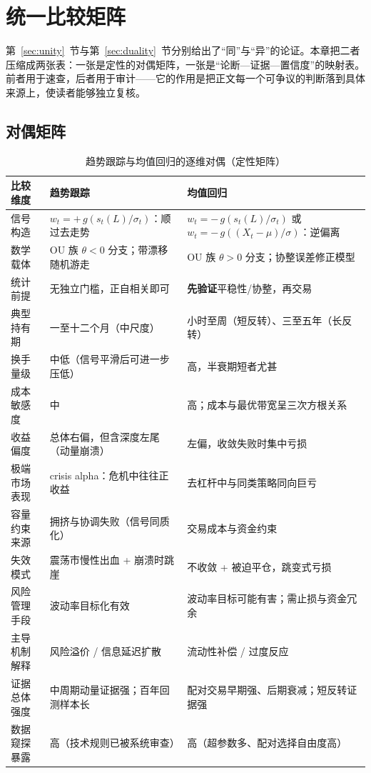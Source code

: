 \section{统一比较矩阵}\label{sec:matrix}

第~\ref{sec:unity}~节与第~\ref{sec:duality}~节分别给出了“同”与“异”的论证。本章把二者压缩成两张表：一张是定性的对偶矩阵，一张是“论断—证据—置信度”的映射表。前者用于速查，后者用于审计——它的作用是把正文每一个可争议的判断落到具体来源上，使读者能够独立复核。

\subsection{对偶矩阵}

\begin{table}[htbp]
\centering\footnotesize
\caption{趋势跟踪与均值回归的逐维对偶（定性矩阵）}\label{tab:dual}
\begin{tabular}{@{}>{\raggedright\arraybackslash}p{2.5cm}>{\raggedright\arraybackslash}p{6.1cm}>{\raggedright\arraybackslash}p{6.1cm}@{}}
\toprule
\textbf{比较维度} & \textbf{趋势跟踪} & \textbf{均值回归} \\
\midrule
信号构造 & $w_t=+\,g\!\left(s_t(L)/\sigma_t\right)$：顺过去走势 &
$w_t=-\,g\!\left(s_t(L)/\sigma_t\right)$ 或 $w_t=-\,g\!\left((X_t-\mu)/\sigma\right)$：逆偏离 \\
数学载体 & OU 族 $\theta<0$ 分支；带漂移随机游走 &
OU 族 $\theta>0$ 分支；协整误差修正模型 \\
统计前提 & 无独立门槛，正自相关即可 & \textbf{先验证}平稳性/协整，再交易 \\
典型持有期 & 一至十二个月（中尺度） & 小时至周（短反转）、三至五年（长反转） \\
换手量级 & 中低（信号平滑后可进一步压低） & 高，半衰期短者尤甚 \\
成本敏感度 & 中 & 高；成本与最优带宽呈三次方根关系 \\
收益偏度 & 总体右偏，但含深度左尾（动量崩溃） & 左偏，收敛失败时集中亏损 \\
极端市场表现 & crisis alpha：危机中往往正收益 & 去杠杆中与同类策略同向巨亏 \\
容量约束来源 & 拥挤与协调失败（信号同质化） & 交易成本与资金约束 \\
失效模式 & 震荡市慢性出血 + 崩溃时跳崖 & 不收敛 + 被迫平仓，跳变式亏损 \\
风险管理手段 & 波动率目标化有效 & 波动率目标可能有害；需止损与资金冗余 \\
主导机制解释 & 风险溢价 / 信息延迟扩散 & 流动性补偿 / 过度反应 \\
证据总体强度 & 中周期动量证据强；百年回测样本长 & 配对交易早期强、后期衰减；短反转证据强 \\
数据窥探暴露 & 高（技术规则已被系统审查） & 高（超参数多、配对选择自由度高） \\
\bottomrule
\end{tabular}
\end{table}


